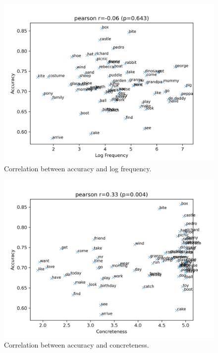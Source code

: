 \begin{figure}
  \centering
  \includegraphics[width=\textwidth]{results/targeted_triplets/results_correlation_frequency_acc.png}
  \caption{Correlation between accuracy and log frequency.}
  \label{fig:results_correlation_frequency_acc}
\end{figure}

\begin{figure}
  \centering
  \includegraphics[width=\textwidth]{results/targeted_triplets/results_correlation_concreteness_acc.png}
  \caption{Correlation between accuracy and concreteness.}
  \label{fig:results_correlation_concreteness_acc}
\end{figure}

